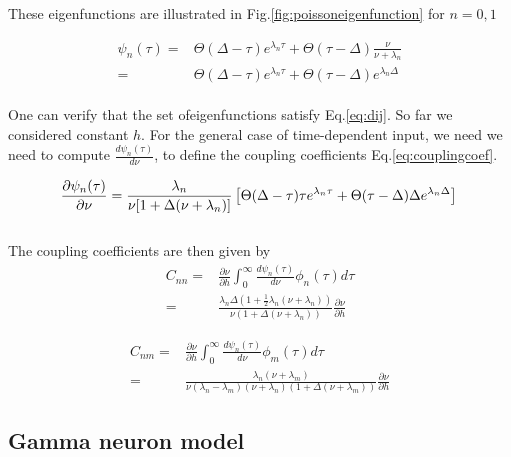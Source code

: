 \documentclass[12pt,twoside]{report}
\begin{document}
These eigenfunctions are illustrated in Fig.\ref{fig:poissoneigenfunction} for $n=0,1$

\begin{align}
\psi_n(\tau)=&\Theta(\Delta-\tau)e^{\lambda_n\tau} +  \Theta(\tau-\Delta) \frac{\nu}{\nu+\lambda_n}\nonumber\\
=&\Theta(\Delta-\tau)e^{\lambda_n\tau} +  \Theta(\tau-\Delta)e^{\lambda_n\Delta}
\end{align}\\

One can verify that the set ofeigenfunctions satisfy Eq.\eqref{eq:dij}.
So far we considered constant $h$. For the general case of time-dependent input, we need we need to compute $\frac{d\psi_n(\tau)}{d\nu}$, to define the coupling coefficients Eq.\eqref{eq:couplingcoef}. 

\begin{equation}
\frac{\partial\psi_n(\tau)}{\partial\nu}=\frac{\lambda_n}{\nu[1+\Delta(\nu+\lambda_n)]}\left[\Theta(\Delta-\tau)\tau e^{\lambda_n\tau} +  \Theta(\tau-\Delta)\Delta e^{\lambda_n\Delta}\right]\\
\end{equation}\\

The coupling coefficients are then given by
\begin{align}
C_{nn}=&\frac{\partial \nu}{\partial h}\int_0^\infty\frac{d\psi_n(\tau)}{d\nu}\phi_n(\tau)d\tau \nonumber\\
=&\frac{\lambda_n\Delta(1+\frac{1}{2}\lambda_n(\nu+\lambda_n))}{\nu(1+\Delta(\nu+\lambda_n))}\frac{\partial \nu}{\partial h}
\end{align}


\begin{align}
C_{nm}=&\frac{\partial \nu}{\partial h}\int_0^\infty\frac{d\psi_n(\tau)}{d\nu}\phi_m(\tau)d\tau \nonumber\\
=&\frac{\lambda_n(\nu+\lambda_m)}{\nu(\lambda_n-\lambda_m)(\nu+\lambda_n)(1+\Delta(\nu+\lambda_m))}\frac{\partial \nu}{\partial h}
\end{align}




\subsection{Gamma neuron model}
\end{document}
